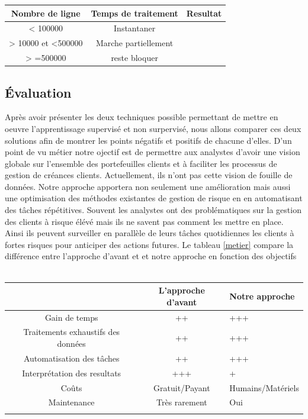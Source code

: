 \documentclass[11pt,a4paper]{report}
\begin{document}
 \begin{tabular}{|c|c|l|} 
\hline  
   Nombre de ligne & Temps de traitement & Resultat\\  
\hline 
< 100000  & Instantaner &  \\  
\hline 
 > 10000 et <500000 & Marche partiellement &  \\  
\hline 
  > =500000 & reste bloquer &  \\
\hline 

\hline 

\end{tabular}

\subsection{Évaluation}
%
%
Après avoir présenter les deux techniques possible permettant de mettre en oeuvre l'apprentissage supervisé et non surpervisé, nous allons comparer ces deux solutions afin de montrer les points négatifs et positifs de chacune d'elles. D'un point de vu métier notre ojectif est de permettre aux analystes d'avoir une vision globale sur l'ensemble des portefeuilles clients et à faciliter les processus de gestion de créances clients. Actuellement, ils n'ont pas cette vision de fouille de données. Notre approche apportera non seulement une amélioration mais aussi une optimisation des méthodes existantes de gestion de risque en en automatisant des tâches répétitives. Souvent les analystes ont des problématiques sur la gestion des clients à risque élévé   mais ils ne savent pas comment les mettre en place. Ainsi ils peuvent surveiller en parallèle de leurs tâches quotidiennes les clients à fortes risques pour anticiper des actions futures. Le tableau \ref{metier} compare la différence entre l'approche d'avant et et notre approche en fonction des objectifs \\\\

\begin{tabular}{|c|c|l|} 
\hline  
    &L'approche d'avant& Notre approche\\  
\hline 
Gain de temps & ++ & +++ \\  
\hline 
  Traitements exhaustifs des données & ++ & +++ \\
\hline 
Automatisation des tâches & ++ & +++ \\
\hline 
Interprétation des resultats & +++ & + \\
\hline 
Coûts & Gratuit/Payant & Humains/Matériels \\
\hline 
Maintenance & Très rarement & Oui\\
\hline 
\label{metier}
\end{tabular}
\newline
\end{document}
